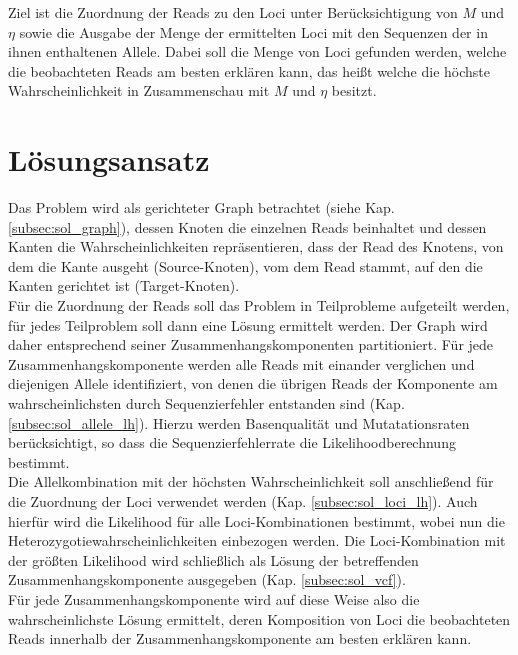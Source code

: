 Ziel ist die Zuordnung der Reads zu den Loci unter Berücksichtigung von $M$ und $\eta$ sowie die Ausgabe der Menge der ermittelten Loci mit den Sequenzen der in ihnen enthaltenen Allele. Dabei soll die Menge von Loci gefunden werden, welche die beobachteten Reads am besten erklären kann, das heißt welche die höchste Wahrscheinlichkeit in Zusammenschau mit $M$ und $\eta$ besitzt. \\

\section{Lösungsansatz} \label{sec:solution}

Das Problem wird als gerichteter Graph betrachtet (siehe Kap. \ref{subsec:sol_graph}), dessen Knoten die einzelnen Reads beinhaltet und dessen Kanten die Wahrscheinlichkeiten repräsentieren, dass der Read des Knotens, von dem die Kante ausgeht (Source-Knoten), vom dem Read stammt, auf den die Kanten gerichtet ist (Target-Knoten). \\

Für die Zuordnung der Reads soll das Problem in Teilprobleme aufgeteilt werden, für jedes Teilproblem soll dann eine Lösung ermittelt werden. Der Graph wird daher entsprechend seiner Zusammenhangskomponenten partitioniert. Für jede Zusammenhangskomponente werden alle Reads mit einander verglichen und diejenigen Allele identifiziert, von denen die übrigen Reads der Komponente am wahrscheinlichsten durch Sequenzierfehler entstanden sind (Kap. \ref{subsec:sol_allele_lh}). Hierzu werden Basenqualität und Mutatationsraten berücksichtigt, so dass die Sequenzierfehlerrate die Likelihoodberechnung bestimmt. \\

Die Allelkombination mit der höchsten Wahrscheinlichkeit soll anschließend für die Zuordnung der Loci verwendet werden (Kap. \ref{subsec:sol_loci_lh}). Auch hierfür wird die Likelihood für alle Loci-Kombinationen bestimmt, wobei nun die Heterozygotiewahrscheinlichkeiten einbezogen werden. Die Loci-Kombination mit der größten Likelihood wird schließlich als Lösung der betreffenden Zusammenhangskomponente ausgegeben (Kap. \ref{subsec:sol_vcf}).\\

Für jede Zusammenhangskomponente wird auf diese Weise also die wahrscheinlichste Lösung ermittelt, deren Komposition von Loci die beobachteten Reads innerhalb der Zusammenhangskomponente am besten erklären kann. \\


